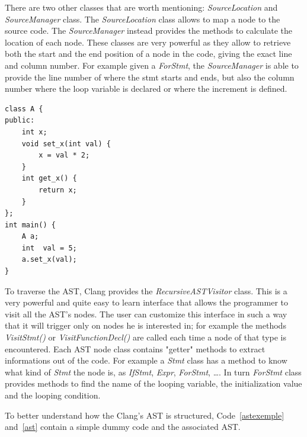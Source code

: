 \documentclass[a4paper,12pt,oneside]{book}
\begin{document}
There are two other classes that are worth mentioning: \emph{SourceLocation} and \emph{SourceManager} class. The \emph{SourceLocation} class allows to map a node to the source code. The \emph{SourceManager} instead provides the methods to calculate the location of each node. These classes are very powerful as they allow to retrieve both the start and the end position of a node in the code, giving the exact line and column number. For example given a \emph{ForStmt}, the \emph{SourceManager} is able to provide the line number of where the stmt starts and ends, but also the column number where the loop variable is declared or where the increment is defined.

\begin{lstlisting}[language=CCC, caption=Simple code., label=astexemple]
class A {
public:
	int x;
	void set_x(int val) {
		x = val * 2;
	}	
	int get_x() {
		return x;
	}
};
int main() {
	A a;
	int  val = 5;
	a.set_x(val);
}
\end{lstlisting}

To traverse the AST, Clang provides the \emph{RecursiveASTVisitor} class. This is a very powerful and quite easy to learn interface that allows the programmer to visit all the AST’s nodes. The user can customize this interface in such a way that it will trigger only on nodes he is interested in; for example the methods \emph{VisitStmt()} or \emph{VisitFunctionDecl()} are called each time a node of that type is encountered. Each AST node class contains "getter" methods to extract informations out of the code. For example a \emph{Stmt} class has a method to know what kind of \emph{Stmt} the node is, as \emph{IfStmt}, \emph{Expr}, \emph{ForStmt}, \dots. In turn \emph{ForStmt} class provides methods to find the name of the looping variable, the initialization value and the looping condition.

To better understand how the Clang’s AST is structured, Code~\ref{astexemple} and~\ref{ast} contain a simple dummy code and the associated AST.
\end{document}

